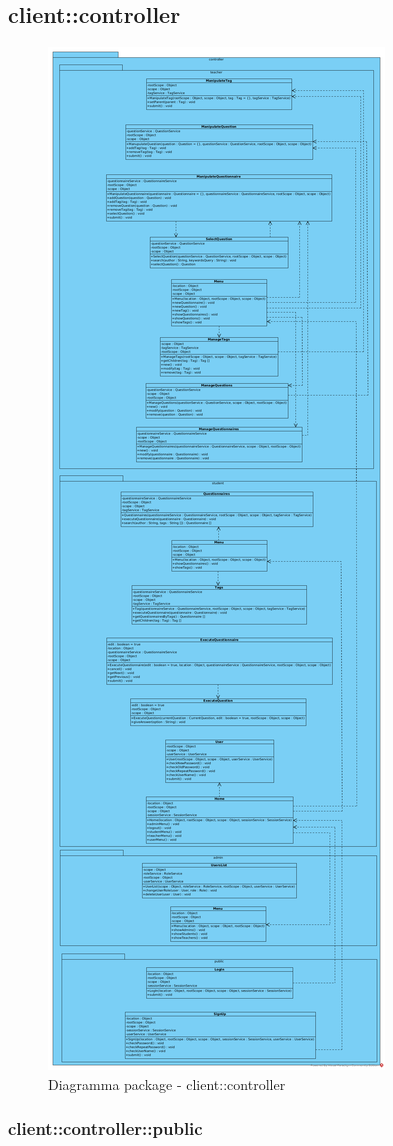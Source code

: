 \subsection{client::controller}
\begin{center}
		\begin{figure}[H]
			\centering \includegraphics[scale=4, max width=\textwidth, max height=\myheight]{../img/diagrammiClassi/client/controller.png}
			\caption{Diagramma package - client::controller}
		\end{figure}
	\end{center}\subsubsection{client::controller::public}
